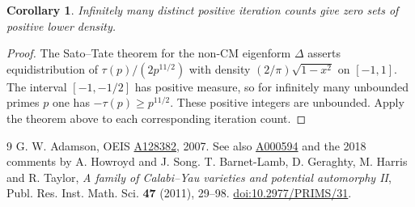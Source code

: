 \documentclass[11pt,letterpaper]{article}
\newtheorem{corollary}[theorem]{Corollary}
\newcommand{\oeis}[1]{\href{https://oeis.org/A#1}{A#1}}
\begin{document}
\begin{corollary}
Infinitely many distinct positive iteration counts give zero sets of positive lower density.
\end{corollary}
\begin{proof}
The Sato--Tate theorem for the non-CM eigenform $\Delta$ asserts equidistribution of $\tau(p)/(2p^{11/2})$ with density $(2/\pi)\sqrt{1-x^2}$ on $[-1,1]$. The interval $[-1,-1/2]$ has positive measure, so for infinitely many unbounded primes $p$ one has $-\tau(p)\ge p^{11/2}$. These positive integers are unbounded. Apply the theorem above to each corresponding iteration count.
\end{proof}

\begin{thebibliography}{9}
 G. W. Adamson, OEIS \oeis{128382}, 2007. See also \oeis{000594} and the 2018 comments by A. Howroyd and J. Song.
 T. Barnet-Lamb, D. Geraghty, M. Harris and R. Taylor, \emph{A family of Calabi--Yau varieties and potential automorphy II}, Publ. Res. Inst. Math. Sci. \textbf{47} (2011), 29--98. \href{https://doi.org/10.2977/PRIMS/31}{doi:10.2977/PRIMS/31}.
\end{thebibliography}
\end{document}
